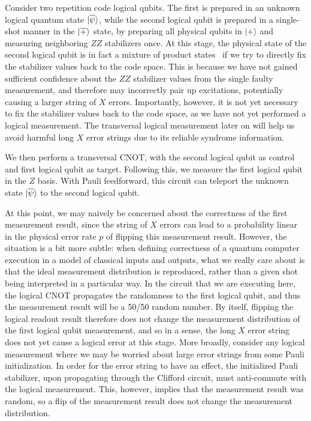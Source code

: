 Consider two repetition code logical qubits.
%
The first is prepared in an unknown logical quantum state $|{\overline{\psi}}\rangle$, while the second logical qubit is prepared in a single-shot manner in the $|{\overline{+}}\rangle$ state, by preparing all physical qubits in $|+\rangle$ and measuring neighboring $ZZ$ stabilizers once.
%
At this stage, the physical state of the second logical qubit is in fact a mixture of product states~\cite{hastings2011topological} if we try to directly fix the stabilizer values back to the code space.
%
This is because we have not gained sufficient confidence about the $ZZ$ stabilizer values from the single faulty measurement, and therefore may incorrectly pair up excitations, potentially causing a larger string of $X$ errors.
%
Importantly, however, it is not yet necessary to fix the stabilizer values back to the code space, as we have not yet performed a logical measurement.
%
The transversal logical measurement later on will help us avoid harmful long $X$ error strings due to its reliable syndrome information.

We then perform a transversal CNOT, with the second logical qubit as control and first logical qubit as target.
%
Following this, we measure the first logical qubit in the $Z$ basis.
%
With Pauli feedforward, this circuit can teleport the unknown state $|{\overline{\psi}}\rangle$ to the second logical qubit.

At this point, we may naively be concerned about the correctness of the first measurement result, since the string of $X$ errors can lead to a probability linear in the physical error rate $p$ of flipping this measurement result.
%
However, the situation is a bit more subtle: when defining correctness of a quantum computer execution in a model of classical inputs and outputs, what we really care about is that the ideal measurement distribution is reproduced, rather than a given shot being interpreted in a particular way.
%
In the circuit that we are executing here, the logical CNOT propagates the randomness to the first logical qubit, and thus the measurement result will be a 50/50 random number.
%
By itself, flipping the logical readout result therefore does not change the measurement distribution of the first logical qubit measurement, and so in a sense, the long $X$ error string does not yet cause a logical error at this stage.
%
More broadly, consider any logical measurement where we may be worried about large error strings from some Pauli initialization.
%
In order for the error string to have an effect, the initialized Pauli stabilizer, upon propagating through the Clifford circuit, must anti-commute with the logical measurement.
%
This, however, implies that the measurement result was random, so a flip of the measurement result does not change the measurement distribution.

